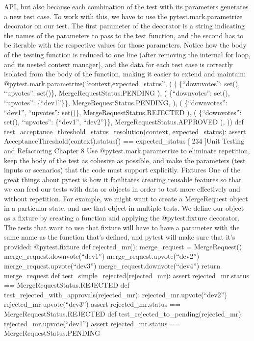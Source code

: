 \documentclass[a4paper,10pt,english]{sphinxmanual}
\begin{document}
API, but also because each combination of the test with its parameters generates a new test
case.
To work with this, we have to use the pytest.mark.parametrize decorator on our test.
The first parameter of the decorator is a string indicating the names of the parameters to
pass to the test function, and the second has to be iterable with the respective values for
those parameters.
Notice how the body of the testing function is reduced to one line (after removing the
internal for loop, and its nested context manager), and the data for each test case is
correctly isolated from the body of the function, making it easier to extend and maintain:
@pytest.mark.parametrize(“context,expected\_status”, (
(
\{“downvotes”: set(), “upvotes”: set()\},
MergeRequestStatus.PENDING
),
(
\{“downvotes”: set(), “upvotes”: \{“dev1”\}\},
MergeRequestStatus.PENDING,
),
(
\{“downvotes”: “dev1”, “upvotes”: set()\},
MergeRequestStatus.REJECTED
),
(
\{“downvotes”: set(), “upvotes”: \{“dev1”, “dev2”\}\},
MergeRequestStatus.APPROVED
),
))
def test\_acceptance\_threshold\_status\_resolution(context, expected\_status):
assert AcceptanceThreshold(context).status() == expected\_status
{[} 234 {]}Unit Testing and Refactoring
Chapter 8
Use @pytest.mark.parametrize to eliminate repetition, keep the body
of the test as cohesive as possible, and make the parameters (test inputs or
scenarios) that the code must support explicitly.
Fixtures
One of the great things about pytest is how it facilitates creating reusable features so that
we can feed our tests with data or objects in order to test more effectively and without
repetition.
For example, we might want to create a MergeRequest object in a particular state, and use
that object in multiple tests. We define our object as a fixture by creating a function and
applying the @pytest.fixture decorator. The tests that want to use that fixture will have
to have a parameter with the same name as the function that’s defined, and pytest will
make sure that it’s provided:
@pytest.fixture
def rejected\_mr():
merge\_request = MergeRequest()
merge\_request.downvote(“dev1”)
merge\_request.upvote(“dev2”)
merge\_request.upvote(“dev3”)
merge\_request.downvote(“dev4”)
return merge\_request
def test\_simple\_rejected(rejected\_mr):
assert rejected\_mr.status == MergeRequestStatus.REJECTED
def test\_rejected\_with\_approvals(rejected\_mr):
rejected\_mr.upvote(“dev2”)
rejected\_mr.upvote(“dev3”)
assert rejected\_mr.status == MergeRequestStatus.REJECTED
def test\_rejected\_to\_pending(rejected\_mr):
rejected\_mr.upvote(“dev1”)
assert rejected\_mr.status == MergeRequestStatus.PENDING
\end{document}
